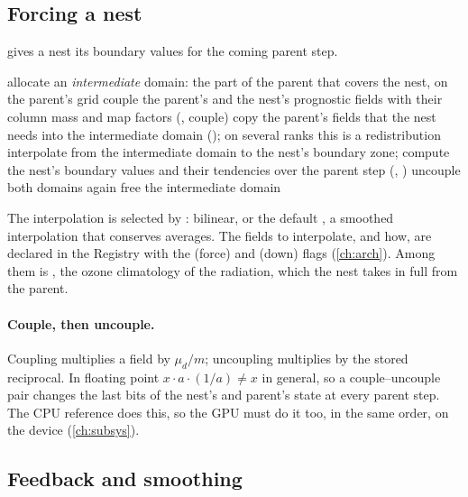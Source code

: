 \subsection{Forcing a nest}

 gives a nest its boundary values for the coming parent step.
\begin{algorithm}[ht]
\caption{Forcing one nest for one parent step ().}
\label{alg:force}
\begin{algorithmic}[1]
\State allocate an \emph{intermediate} domain: the part of the parent that covers the nest, on the parent's grid
\State couple the parent's and the nest's prognostic fields with their column mass and map factors (, couple)
\State copy the parent's fields that the nest needs into the intermediate domain (); on several ranks this is a redistribution
\State interpolate from the intermediate domain to the nest's boundary zone; compute the nest's boundary values and their tendencies over the parent step (, )
\State uncouple both domains again
\State free the intermediate domain
\end{algorithmic}
\end{algorithm}

The interpolation is selected by : bilinear, or the default , a smoothed
interpolation that conserves averages. The fields to interpolate, and how, are declared in the Registry with the
 (force) and  (down) flags (\cref{ch:arch}). Among them is , the ozone climatology of the
radiation, which the nest takes in full from the parent.

\paragraph{Couple, then uncouple.} Coupling multiplies a field by $\mu_d/m$; uncoupling multiplies by the stored
reciprocal. In floating point $x\cdot a\cdot(1/a) \ne x$ in general, so a couple--uncouple pair changes the last bits
of the nest's and parent's state at every parent step. The CPU reference does this, so the GPU must do it too, in the
same order, on the device (\cref{ch:subsys}).

\subsection{Feedback and smoothing}

